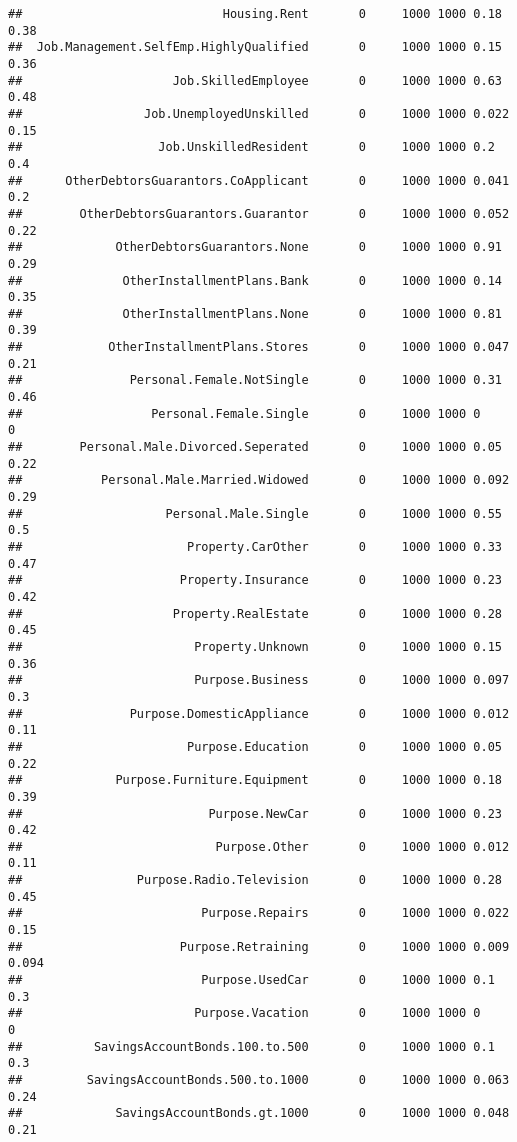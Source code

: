 \documentclass[]{article}
\begin{document}
\begin{verbatim}
##                            Housing.Rent       0     1000 1000 0.18  0.38 
##  Job.Management.SelfEmp.HighlyQualified       0     1000 1000 0.15  0.36 
##                     Job.SkilledEmployee       0     1000 1000 0.63  0.48 
##                 Job.UnemployedUnskilled       0     1000 1000 0.022 0.15 
##                   Job.UnskilledResident       0     1000 1000 0.2   0.4  
##      OtherDebtorsGuarantors.CoApplicant       0     1000 1000 0.041 0.2  
##        OtherDebtorsGuarantors.Guarantor       0     1000 1000 0.052 0.22 
##             OtherDebtorsGuarantors.None       0     1000 1000 0.91  0.29 
##              OtherInstallmentPlans.Bank       0     1000 1000 0.14  0.35 
##              OtherInstallmentPlans.None       0     1000 1000 0.81  0.39 
##            OtherInstallmentPlans.Stores       0     1000 1000 0.047 0.21 
##               Personal.Female.NotSingle       0     1000 1000 0.31  0.46 
##                  Personal.Female.Single       0     1000 1000 0     0    
##        Personal.Male.Divorced.Seperated       0     1000 1000 0.05  0.22 
##           Personal.Male.Married.Widowed       0     1000 1000 0.092 0.29 
##                    Personal.Male.Single       0     1000 1000 0.55  0.5  
##                       Property.CarOther       0     1000 1000 0.33  0.47 
##                      Property.Insurance       0     1000 1000 0.23  0.42 
##                     Property.RealEstate       0     1000 1000 0.28  0.45 
##                        Property.Unknown       0     1000 1000 0.15  0.36 
##                        Purpose.Business       0     1000 1000 0.097 0.3  
##               Purpose.DomesticAppliance       0     1000 1000 0.012 0.11 
##                       Purpose.Education       0     1000 1000 0.05  0.22 
##             Purpose.Furniture.Equipment       0     1000 1000 0.18  0.39 
##                          Purpose.NewCar       0     1000 1000 0.23  0.42 
##                           Purpose.Other       0     1000 1000 0.012 0.11 
##                Purpose.Radio.Television       0     1000 1000 0.28  0.45 
##                         Purpose.Repairs       0     1000 1000 0.022 0.15 
##                      Purpose.Retraining       0     1000 1000 0.009 0.094
##                         Purpose.UsedCar       0     1000 1000 0.1   0.3  
##                        Purpose.Vacation       0     1000 1000 0     0    
##          SavingsAccountBonds.100.to.500       0     1000 1000 0.1   0.3  
##         SavingsAccountBonds.500.to.1000       0     1000 1000 0.063 0.24 
##             SavingsAccountBonds.gt.1000       0     1000 1000 0.048 0.21 

\end{verbatim}
\end{document}
